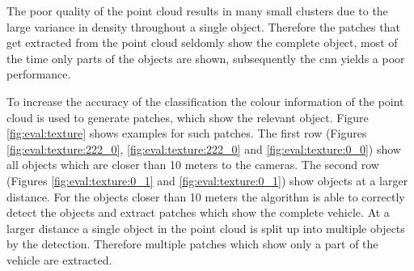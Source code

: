 The poor quality of the point cloud results in many small clusters due to the large variance in density throughout a single object. Therefore the patches that get extracted from the point cloud seldomly show the complete object, most of the time only parts of the objects are shown, subsequently the \ac{cnn} yields a poor performance.

To increase the accuracy of the classification the colour information of the point cloud is used to generate patches, which show the relevant object. Figure \ref{fig:eval:texture} shows examples for such patches.
The first row (Figures \ref{fig:eval:texture:222_0}, \ref{fig:eval:texture:222_0} and \ref{fig:eval:texture:0_0}) show all objects which are closer than 10 meters to the cameras.
The second row (Figures \ref{fig:eval:texture:0_1} and \ref{fig:eval:texture:0_1}) show objects at a larger distance.
For the objects closer than 10 meters the algorithm is able to correctly detect the objects and extract patches which show the complete vehicle. 
At a larger distance a single object in the point cloud is split up into multiple objects by the detection.
Therefore multiple patches which show only a part of the vehicle are extracted.

